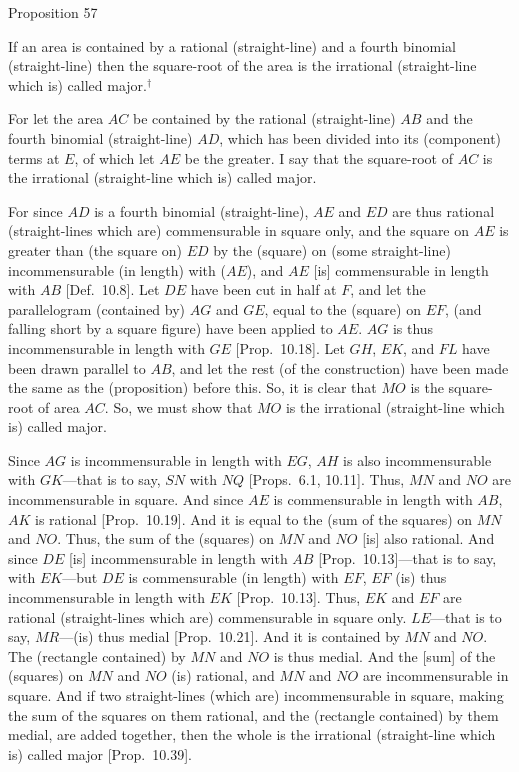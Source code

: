 
\begin{center}
{\large Proposition 57}
\end{center}

If an area is contained by a rational (straight-line)
and a fourth binomial (straight-line) then the square-root of the area
is the irrational (straight-line which is) called major.$^\dag$

\epsfysize=1.3in
\centerline{}

For let the area $AC$ be contained by the rational (straight-line) $AB$
and the fourth binomial (straight-line) $AD$, which has been divided into
its (component) terms at $E$, of which let $AE$ be the greater. I say that
the square-root of $AC$ is the irrational (straight-line which is) called major.

For since $AD$ is a fourth binomial (straight-line), $AE$ and $ED$
are thus rational (straight-lines which are) commensurable in square only,
and the square on $AE$ is greater than (the square on) $ED$ by the
(square) on (some straight-line) incommensurable (in length) with ($AE$),
and $AE$ [is] commensurable in length with $AB$ [Def.~10.8]. Let $DE$ have been cut in half at $F$,
and let the parallelogram (contained by) $AG$ and $GE$, equal to the
(square) on $EF$, (and falling short by a square figure) have been applied to
$AE$. $AG$ is thus incommensurable in length with $GE$ [Prop.~10.18]. Let $GH$, $EK$, and $FL$
have been drawn parallel to $AB$, and let the rest (of the construction) have been made the same as the (proposition) before this. So, it is clear that
$MO$ is the square-root of  area $AC$. So, we must show that $MO$
is the irrational (straight-line which is) called major.

Since $AG$ is incommensurable in length with $EG$, $AH$
is also incommensurable with $GK$---that is to say, $SN$
 with $NQ$ [Props.~6.1, 10.11].  Thus, $MN$ and $NO$
 are incommensurable in square. And since $AE$ is
 commensurable in length with $AB$, $AK$ is rational [Prop.~10.19].  And it is equal to the (sum of the squares) on $MN$ and $NO$.  Thus, the sum of the (squares) on 
 $MN$ and $NO$ [is] also rational. And since $DE$ [is]  incommensurable
 in length with $AB$ [Prop.~10.13]---that is to say, with $EK$---but $DE$ is commensurable (in length) with $EF$, $EF$ (is) thus incommensurable
 in length with $EK$ [Prop.~10.13].
 Thus, $EK$ and $EF$ are rational (straight-lines which are) commensurable
 in square only. $LE$---that is to say, $MR$---(is) thus medial
 [Prop.~10.21]. And it is contained by $MN$ and $NO$. The (rectangle contained) by $MN$ and $NO$ is thus medial. And
 the [sum] of the (squares) on $MN$ and $NO$ (is) rational, and
 $MN$ and $NO$ are incommensurable in square. And if two
 straight-lines (which are) incommensurable in square, making the
 sum of the squares on them rational, and the (rectangle contained) by them
 medial, are added together, then the whole is the irrational (straight-line which is) called major [Prop.~10.39].
 
